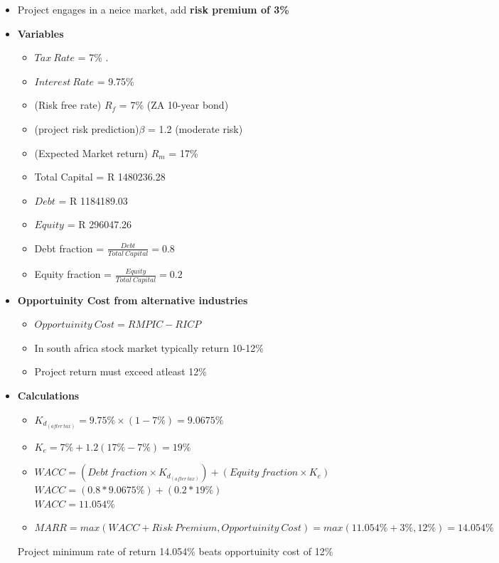 \documentclass{article}
\begin{document}
\begin{itemize}
\begin{itemize}
      \end{itemize}
    \item Project engages in a neice market, add \textbf{risk premium of 3\%}
    \item\textbf{Variables}
      \begin{itemize}
        \item $Tax \ Rate$ = 7\% \cite{sars}. 
        \item $Interest \ Rate$ = 9.75\% \cite{fatcat}
        \item (Risk free rate) $R_f$ = 7\% (ZA 10-year bond)
        \item (project risk prediction)$\beta$ =  1.2 (moderate risk)
        \item (Expected Market return) $R_m$ = 17\% \cite{simplywall} 
        \item Total Capital = R 1480236.28
        \item $Debt$ = R 1184189.03%
        \item $Equity$ = R 296047.26 %
        \item Debt fraction = $\frac{Debt}{Total \ Capital} = 0.8$
        \item Equity fraction = $\frac{Equity}{Total \ Capital} = 0.2$
      \end{itemize}
    \item\textbf{Opportuinity Cost from alternative industries}
      \begin{itemize}
        \item $Opportuinity \ Cost = RMPIC - RICP$
        \item In south africa stock market typically return 10-12\%
        \item Project return must exceed atleast 12\%
      \end{itemize}
    \item\textbf{Calculations}
      \begin{itemize}
        \item $K_{d_{(after \ tax)}}=9.75\%\times(1-7\%)=9.0675\%$
        \item $K_e=7\%+1.2(17\%-7\%)=19\%$
        \item $WACC=(Debt \ fraction \times K_{d_{(after \ tax)}}) + (Equity \
          fraction \times K_e)$ \\
          $WACC=(0.8*9.0675\%)+(0.2*19\%)$ \\
          $WACC=11.054\%$
        \item $MARR = max(WACC+Risk \ Premium,Opportuinity \ Cost) =
          max(11.054\%+3\%,12\%) = 14.054\%$ 
      \end{itemize}
      Project minimum rate of return 14.054\% beats opportuinity cost of 12\%
  \end{itemize}
\end{document}
